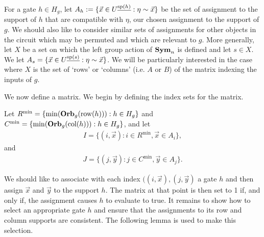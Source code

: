 \documentclass[../paper.tex]{subfiles}
\begin{document}
For a gate $h \in H_g$, let $A_h := \{\vec{x} \in U^{\underline{\text{sp}(h)}} :
\eta \sim \vec{x}\}$ be the set of assignment to the support of $h$ that are
compatible with $\eta$, our chosen assignment to the support of $g$. We should
also like to consider similar sets of assignments for other objects in the
circuit which may be permuted and which are relevant to $g$. More generally, let
$X$ be a set on which the left group action of $\text{\textbf{Sym}}_n$ is defined and let $s
\in X$. We let $A_s = \{\vec{x} \in U^{\underline{\text{sp}(s)}} : \eta \sim
\vec{x}\}$. We will be particularly interested in the case where $X$ is the set
of `rows' or `columns' (i.e. $A$ or $B$) of the matrix indexing the inputs of
$g$.


We now define a matrix. We begin by defining the index sets for the matrix.

Let $R^{\min} = \{\min (\text{\textbf{Orb}}_g(\text{row}(h))) : h \in H_g\}$ and $C^{\min} = \{ \min
(\text{\textbf{Orb}}_g (\text{col}(h))) : h \in H_g\}$, and let
\begin{align*}
  I = \{(i, \vec{x}): i \in R^{\min}, \vec{x} \in A_i\},
\end{align*}
and
\begin{align*}
  J = \{(j, \vec{y}): j \in C^{\min}, \vec{y} \in A_j\}.
\end{align*}

We should like to associate with each index $((i, \vec{x}), (j, \vec{y})$ a gate
$h$ and then assign $\vec{x}$ and $\vec{y}$ to the support $h$. The matrix at
that point is then set to 1 if, and only if, the assignment causes $h$ to
evaluate to true. It remains to show how to select an appropriate gate $h$ and
ensure that the assignments to its row and column supports are consistent. The
following lemma is used to make this selection.
\end{document}

